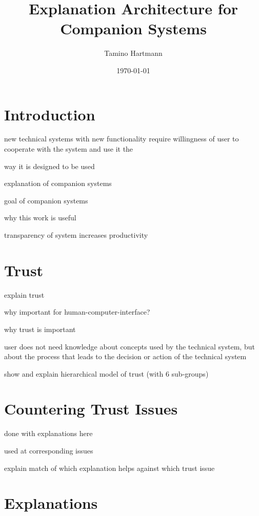 \documentclass[a4paper]{article}
\begin{document}
\title{Explanation Architecture for Companion Systems}
\author{Tamino Hartmann}
\date{\today}

\maketitle
\newpage

\tableofcontents

\newpage

\section{Introduction}

new technical systems with new functionality require willingness of user to cooperate with the system and use it the

way it is designed to be used

explanation of companion systems

goal of companion systems

why this work is useful

transparency of system increases productivity

\section{Trust}

explain trust

why important for human-computer-interface?

why trust is important

user does not need knowledge about concepts used by the technical system, but about the process that leads to the decision or action of the technical system

show and explain hierarchical model of trust (with 6 sub-groups)

\section{Countering Trust Issues}

done with explanations here

used at corresponding issues

explain match of which explanation helps against which trust issue

\section{Explanations}
\end{document}
